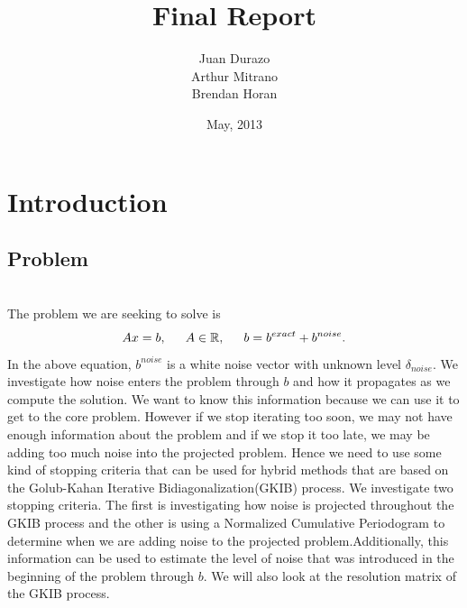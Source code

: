 \documentclass[11pt]{amsart}
\title{Final Report}
\author{Juan Durazo \\ Arthur Mitrano \\ Brendan Horan}
\date{May, 2013}
\begin{document}
\maketitle

\section{Introduction}
\subsection{Problem} \indent \\
The problem we are seeking to solve is 
\begin{equation*}
  Ax=b, \indent A  \in  \mathbb{R}, \indent b = b^{exact} + b^{noise}.
\end{equation*}
In the above equation, $b^{noise}$ is a white noise vector with unknown level 
$\delta_{noise}$. We investigate how noise enters the problem through $b$ and 
how it propagates as we compute the solution. We want to know this information because
we can use it to get to the core problem. However if  we stop iterating too soon, 
we may not have enough information about the problem and if we stop it too late, 
we may be adding too much noise into the projected problem. 
Hence we need to use some kind of stopping criteria that can be used for 
hybrid methods that are based on the Golub-Kahan Iterative
Bidiagonalization(GKIB) process. We investigate two stopping criteria. 
The first is investigating how noise is projected throughout the GKIB process
and the other is using a Normalized Cumulative Periodogram to determine
when we are adding noise to the projected problem.Additionally,  this information can 
be used to estimate the level of noise that was introduced in the beginning of the problem
through $b$. We will also look at the resolution matrix of the GKIB process.
\end{document}

